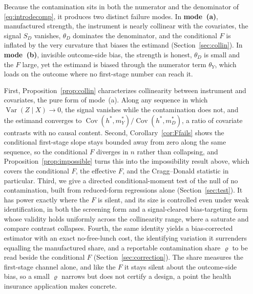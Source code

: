\documentclass[preprint,11pt,authoryear]{elsarticle}
\theoremstyle{definition}
\newcommand{\Cov}{\operatorname{Cov}}
\newcommand{\Var}{\operatorname{Var}}
\begin{document}
Because the contamination sits in both the numerator and
the denominator of \eqref{eq:introdecomp}, it produces two distinct failure modes. In
\textbf{mode~(a)}, manufactured strength, the instrument is nearly collinear with
the covariates, the signal $S_D$ vanishes, $\theta_D$ dominates the denominator, and the
conditional $F$ is inflated by the very curvature that biases the estimand
(Section~\ref{sec:collin}). In \textbf{mode~(b)}, invisible outcome-side bias, the
strength is honest, $\theta_D$ is small and the $F$ large, yet the estimand is
biased through the numerator term $\theta_Y$, which loads on the outcome where no
first-stage number can reach it.

First, Proposition~\ref{prop:collin} characterizes
collinearity between instrument and covariates, the pure form of mode~(a). Along any sequence in
which $\Var(Z\mid X)\to0$, the signal vanishes while the contamination does not, and the
estimand converges to $\Cov(h^\ast,m_Y^\ast)/\Cov(h^\ast,m_D^\ast)$, a ratio of covariate
contrasts with no causal content. Second, Corollary~\ref{cor:Ffails} shows the
conditional first-stage slope stays bounded away from zero along the same sequence, so
the conditional $F$ diverges in $n$ rather than collapsing, and
Proposition~\ref{prop:impossible} turns this into the impossibility result above, which
covers the conditional $F$, the effective $F$, and the Cragg--Donald statistic in
particular. Third, we give a directed
conditional-moment test of the null of no contamination, built from reduced-form
regressions alone (Section~\ref{sec:test}). It has power exactly where the $F$ is silent,
and its size is controlled even under weak identification, in both the screening form
and a signal-cleared bias-targeting form whose validity holds uniformly across the
collinearity range, where a saturate and compare contrast collapses. Fourth, the same identity yields a
bias-corrected estimator with an exact no-free-lunch cost, the identifying variation it
surrenders equalling the manufactured share, and a reportable contamination share
$\varrho$ to be read beside the conditional $F$ (Section~\ref{sec:correction}). The share
measures the first-stage channel alone, and like the $F$ it stays silent about the
outcome-side bias, so a small $\varrho$ narrows but does not certify a design, a point
the health insurance application makes concrete.
\end{document}
